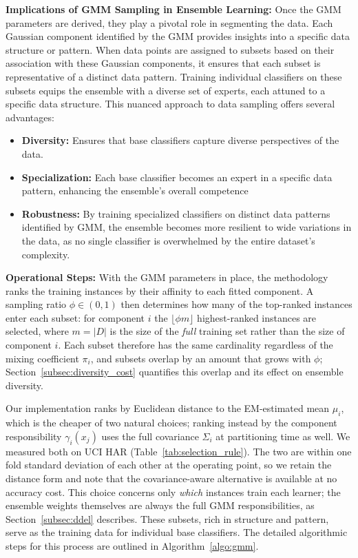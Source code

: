 \documentclass[lettersize,journal]{IEEEtran}
\begin{document}
	\textbf{Implications of GMM Sampling in Ensemble Learning:} Once the
	GMM parameters are derived, they play a pivotal role in segmenting the data.
	Each Gaussian component identified by the GMM provides insights into a
	specific data structure or pattern. When data points are assigned to subsets
	based on their association with these Gaussian components, it ensures that
	each subset is representative of a distinct data pattern. Training individual
	classifiers on these subsets equips the ensemble with a diverse set of experts,
	each attuned to a specific data structure. This nuanced approach to data sampling offers several advantages:
	\begin{itemize}
		\item \textbf{Diversity:} Ensures that base classifiers capture diverse perspectives of the data.
		\item \textbf{Specialization:} Each base classifier becomes an expert in a specific
		data pattern, enhancing the ensemble’s overall competence
		\item \textbf{Robustness:} By training specialized classifiers on distinct data patterns identified by GMM, the ensemble becomes more resilient to wide variations in the data, as no single classifier is overwhelmed by the entire dataset's complexity.
	\end{itemize}
	\textbf{Operational Steps:} With the GMM parameters in place, the methodology ranks
	the training instances by their affinity to each fitted component. A
	sampling ratio $\phi \in (0,1)$ then determines how many of the top-ranked instances
	enter each subset: for component $i$ the $\lfloor \phi m \rfloor$ highest-ranked
	instances are selected, where $m = |D|$ is the size of the \emph{full} training set
	rather than the size of component $i$. Each subset therefore has the same cardinality
	regardless of the mixing coefficient $\pi_i$, and subsets overlap by an amount that
	grows with $\phi$; Section~\ref{subsec:diversity_cost} quantifies this overlap and its
	effect on ensemble diversity.

	Our implementation ranks by Euclidean distance to the EM-estimated mean $\mu_i$, which
	is the cheaper of two natural choices; ranking instead by the component responsibility
	$\gamma_i(x_j)$ uses the full covariance $\Sigma_i$ at partitioning time as well. We
	measured both on UCI HAR (Table~\ref{tab:selection_rule}). The two are within one fold
	standard deviation of each other at the operating point, so we retain the distance form
	and note that the covariance-aware alternative is available at no accuracy cost. This
	choice concerns only \emph{which} instances train each learner; the ensemble weights
	themselves are always the full GMM responsibilities, as Section~\ref{subsec:ddel}
	describes. These subsets, rich in
	structure and pattern, serve as the training data for individual base classifiers.
	The detailed algorithmic steps for this process are outlined in Algorithm~\ref{algo:gmm}.
	
\end{document}
